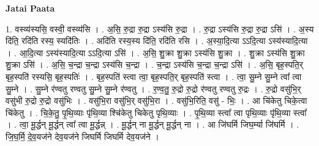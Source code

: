 \documentclass[17pt]{extarticle}
\begin{document}
\textbf{Jatai Paata} \newline

1. वस्व्य॑स्यसि॒ वस्वी॒ वस्व्य॑सि । . अ॒सि॒ रु॒द्रा रु॒द्रा ऽस्य॑सि रु॒द्रा । . रु॒द्रा ऽस्य॑सि रु॒द्रा रु॒द्रा ऽसि॑ । . अ॒स्य दि॑ति॒ रदि॑ति रस्य॒ स्यदि॑तिः । . अदि॑ति रस्य॒स्य दि॑ति॒ रदि॑ति रसि । . अ॒स्या॒दि॒त्या ऽऽदि॒त्या ऽस्य॑स्यादि॒त्या । . आ॒दि॒त्या ऽस्य॑स्यादि॒त्या ऽऽदि॒त्या ऽसि॑ । . अ॒सि॒ शु॒क्रा शु॒क्रा ऽस्य॑सि शु॒क्रा । . शु॒क्रा ऽस्य॑सि शु॒क्रा शु॒क्रा ऽसि॑ । . अ॒सि॒ च॒न्द्रा च॒न्द्रा ऽस्य॑सि च॒न्द्रा । . च॒न्द्रा ऽस्य॑सि च॒न्द्रा च॒न्द्रा ऽसि॑ । . अ॒सि॒ बृह॒स्पति॒र् बृह॒स्पति॑ रस्यसि॒ बृह॒स्पतिः॑ । . बृह॒स्पति॑ स्त्वा त्वा॒ बृह॒स्पति॒र् बृह॒स्पति॑ स्त्वा । . त्वा॒ सु॒म्ने सु॒म्ने त्वा᳚ त्वा सु॒म्ने । . सु॒म्ने र॑ण्वतु रण्वतु सु॒म्ने सु॒म्ने र॑ण्वतु । . र॒ण्व॒तु॒ रु॒द्रो रु॒द्रो र॑ण्वतु रण्वतु रु॒द्रः । . रु॒द्रो वसु॑भि॒र् वसु॑भी रु॒द्रो रु॒द्रो वसु॑भिः । . वसु॑भि॒रा वसु॑भि॒र् वसु॑भि॒रा । . वसु॑भि॒रिति॒ वसु॑ - भिः॒ । . आ चि॑केतु चिके॒त्वा चि॑केतु । . चि॒के॒तु॒ पृ॒थि॒व्याः पृ॑थि॒व्या श्चि॑केतु चिकेतु पृथि॒व्याः । . पृ॒थि॒व्या स्त्वा᳚ त्वा पृथि॒व्याः पृ॑थि॒व्या स्त्वा᳚ । . त्वा॒ मू॒र्द्धन् मू॒र्द्धन् त्वा᳚ त्वा मू॒र्द्धन्न् । . मू॒र्द्धन् ना मू॒र्द्धन् मू॒र्द्धन् ना । . आ जि॑घर्मि जिघ॒र्म्या जि॑घर्मि । . जि॒घ॒र्मि॒ दे॒व॒यज॑ने देव॒यज॑ने जिघर्मि जिघर्मि देव॒यज॑ने । \newline
\end{document}
